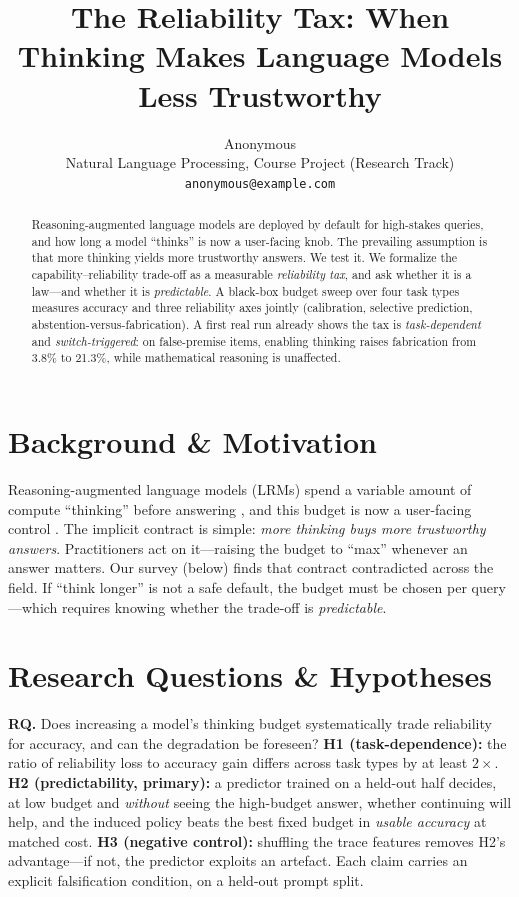 \documentclass[11pt]{article}
\title{The Reliability Tax: When Thinking Makes Language Models Less Trustworthy}
\author{Anonymous \\
  Natural Language Processing, Course Project (Research Track) \\
  \texttt{anonymous@example.com}}
\begin{document}
\maketitle

\begin{abstract}
Reasoning-augmented language models are deployed by default for high-stakes
queries, and how long a model ``thinks'' is now a user-facing knob. The
prevailing assumption is that more thinking yields more trustworthy answers.
We test it. We formalize the capability--reliability trade-off as a measurable
\emph{reliability tax}, and ask whether it is a law---and whether it is
\emph{predictable}. A black-box budget sweep over four task types measures
accuracy and three reliability axes jointly (calibration, selective
prediction, abstention-versus-fabrication). A first real run already shows the
tax is \emph{task-dependent} and \emph{switch-triggered}: on false-premise
items, enabling thinking raises fabrication from 3.8\% to 21.3\%, while
mathematical reasoning is unaffected.
\end{abstract}

\section{Background \& Motivation}
Reasoning-augmented language models (LRMs) spend a variable amount of compute
``thinking'' before answering \citep{Guo2025DeepSeekR1}, and this budget is now
a user-facing control \citep{Muennighoff2025s1,Snell2024TestTimeCompute}. The
implicit contract is simple: \emph{more thinking buys more trustworthy
answers}. Practitioners act on it---raising the budget to ``max'' whenever an
answer matters. Our survey (below) finds that contract contradicted across the
field. If ``think longer'' is not a safe default, the budget must be chosen per
query---which requires knowing whether the trade-off is \emph{predictable}.

\section{Research Questions \& Hypotheses}
\textbf{RQ.} Does increasing a model's thinking budget systematically trade
reliability for accuracy, and can the degradation be foreseen?
\textbf{H1 (task-dependence):} the ratio of reliability loss to accuracy gain
differs across task types by at least $2\times$. \textbf{H2 (predictability,
primary):} a predictor trained on a held-out half decides, at low budget and
\emph{without} seeing the high-budget answer, whether continuing will help, and
the induced policy beats the best fixed budget in \emph{usable accuracy} at
matched cost. \textbf{H3 (negative control):} shuffling the trace features
removes H2's advantage---if not, the predictor exploits an artefact.
Each claim carries an explicit falsification condition, on a held-out prompt
split.
\end{document}
